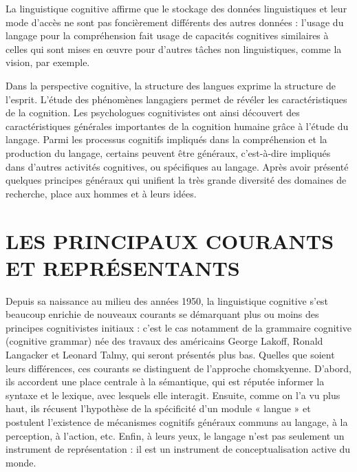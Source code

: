  La linguistique cognitive affirme que le stockage des données linguistiques et leur mode d’accès ne sont pas foncièrement différents des autres données : l’usage du langage pour la compréhension fait usage de capacités cognitives similaires à celles qui sont mises en œuvre pour d’autres tâches non linguistiques, comme la vision, par exemple.\par

 Dans la perspective cognitive, la structure des langues exprime la structure de l’esprit. L'étude des phénomènes langagiers permet de révéler les caractéristiques de la cognition. Les psychologues cognitivistes ont ainsi découvert des caractéristiques générales importantes de la cognition humaine grâce à l’étude du langage. Parmi les processus cognitifs impliqués dans la compréhension et la production du langage, certains peuvent être généraux, c’est-à-dire impliqués dans d’autres activités cognitives, ou spécifiques au langage. Après avoir présenté quelques principes généraux qui unifient la très grande diversité des domaines de recherche, place aux hommes et à leurs idées.\par

\section{LES PRINCIPAUX COURANTS ET REPRÉSENTANTS}

Depuis sa naissance au milieu des années 1950, la linguistique cognitive s’est beaucoup enrichie de nouveaux courants se démarquant plus ou moins des principes cognitivistes initiaux : c’est le cas notamment de la grammaire cognitive (cognitive grammar) née des travaux des américains George Lakoff, Ronald Langacker et Leonard Talmy, qui seront présentés plus bas. Quelles que soient leurs différences, ces courants se distinguent de l'approche chomskyenne. D'abord, ils accordent une place centrale à la sémantique, qui est réputée informer la syntaxe et le lexique, avec lesquels elle interagit. Ensuite, comme on l’a vu plus haut, ils récusent l’hypothèse de la spécificité d’un module « langue » et postulent l’existence de mécanismes cognitifs généraux communs au langage, à la perception, à l’action, etc. Enfin, à leurs yeux, le langage n’est pas seulement un instrument de représentation : il est un instrument de conceptualisation active du monde.\par

